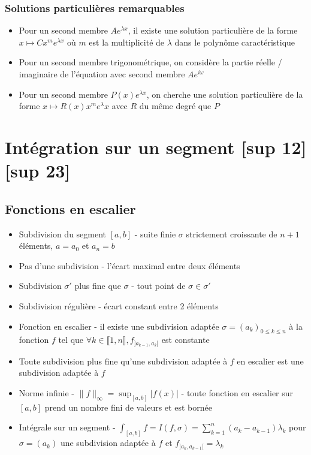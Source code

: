 \documentclass[openany]{book}
\begin{document}
\subsubsection{Solutions particulières remarquables}
\begin{itemize}
    \item Pour un second membre $Ae^{\lambda x}$, il existe une solution particulière de la forme $x \mapsto Cx^m e^{\lambda x}$ où $m$ est la multiplicité de $\lambda$ dans le polynôme caractéristique
    \item Pour un second membre trigonométrique, on considère la partie réelle / imaginaire de l'équation avec second membre $Ae^{i\omega}$
    \item Pour un second membre $P(x)e^{\lambda x}$, on cherche une solution particulière de la forme $x \mapsto R(x) x^m e^{\lambda}x$ avec $R$ du même degré que $P$
\end{itemize}

\clearpage
\section{Intégration sur un segment [sup 12] [sup 23]}
\subsection{Fonctions en escalier}
\begin{itemize}
    \item Subdivision du segment $[a,b]$ - suite finie $\sigma$ strictement croissante de $n + 1 $ éléments, $a = a_0$ et $a_n = b$
    \item Pas d'une subdivision - l'écart maximal entre deux éléments
    \item Subdivision $\sigma '$ plus fine que $\sigma$ - tout point de $\sigma \in \sigma '$
    \item Subdivision régulière - écart constant entre 2 éléments 
    \item Fonction en escalier - il existe une subdivision adaptée $\sigma = (a_k)_{0\leq k \leq n}$ à la fonction $f$ tel que $\forall k \in \llbracket 1, n \rrbracket, f_{] a_{k-1}, a_k [}$ est constante
    \item Toute subdivision plus fine qu'une subdivision adaptée à $f$ en escalier est une subdivision adaptée à $f$
    \item Norme infinie - $ \| f \|_{\infty} = \sup_{[a,b]} |f(x)| $ - toute fonction en escalier sur $[a,b]$ prend un nombre fini de valeurs et est bornée
    \item Intégrale sur un segment - $\int_{[a, b]} f = I(f, \sigma) = \sum_{k=1}^{n} (a_k - a_{k-1})\lambda_k $ pour $\sigma = (a_k)$ une subdivision adaptée à $f$ et $f_{]a_k, a_{k-1}[} = \lambda_k$
\end{itemize}
\end{document}
